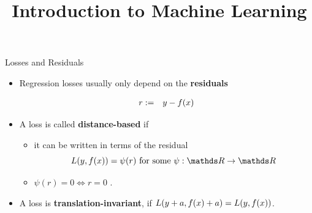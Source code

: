 




\newcommand{\titlefigure}{figure_man/optimization_steps.jpeg}
\newcommand{\learninggoals}{
\item Understand that an ML model is simply a parametrized curve
\item Understand that the hypothesis space lists all admissible models
    for a learner
\item Understand the relationship between the hypothesis space and the parameter space
}

\title{Introduction to Machine Learning}
\date{}






\begin{vbframe}{Losses and Residuals}

\begin{itemize}
  \item Regression losses usually only depend on the \textbf{ residuals}

  \vspace*{-0.5cm}

  \begin{eqnarray*}
    r &:=& y - \fx %
  \end{eqnarray*}


  \item A loss is called \textbf{distance-based} if
  \begin{itemize}
    \item it can be written in terms of the residual
    $$
      \Lxy = \psi (r) \text{ for some } \psi: \R \to \R
    $$
    \item $\psi(r) = 0 \Leftrightarrow r = 0$ .
  \end{itemize}
  \item A loss is \textbf{translation-invariant}, if $L(y + a, f(x) + a) = L(y, f(x))$.

\end{itemize}

\end{vbframe}



